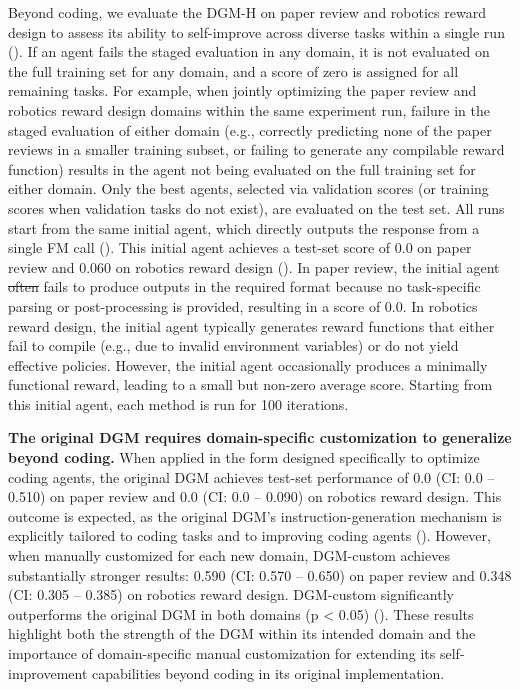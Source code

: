 \documentclass[]{fairmeta}
\providecommand{\DIFdeltex}[1]{{\protect\color{red}\sout{#1}}}                      %
\providecommand{\DIFdelbegin}{} %
\providecommand{\DIFdelend}{} %
\providecommand{\DIFdel}[1]{\texorpdfstring{\DIFdeltex{#1}}{}} %
\begin{document}
Beyond coding, we evaluate the DGM-H on paper review and robotics reward design to assess its ability to self-improve across diverse tasks within a single run (). If an agent fails the staged evaluation in any domain, it is not evaluated on the full training set for any domain, and a score of zero is assigned for all remaining tasks. For example, when jointly optimizing the paper review and robotics reward design domains within the same experiment run, failure in the staged evaluation of either domain (e.g., correctly predicting none of the paper reviews in a smaller training subset, or failing to generate any compilable reward function) results in the agent not being evaluated on the full training set for either domain. Only the best agents, selected via validation scores (or training scores when validation tasks do not exist), are evaluated on the test set.
All runs start from the same initial agent, which directly outputs the response from a single FM call (). This initial agent achieves a test-set score of 0.0 on paper review and 0.060 on robotics reward design (). In paper review, the initial agent \DIFdelbegin \DIFdel{often }\DIFdelend fails to produce outputs in the required format because no task-specific parsing or post-processing is provided, resulting in a score of 0.0. In robotics reward design, the initial agent typically generates reward functions that either fail to compile (e.g., due to invalid environment variables) or do not yield effective policies. However, the initial agent occasionally produces a minimally functional reward, leading to a small but non-zero average score. Starting from this initial agent, each method is run for 100 iterations.

\textbf{The original DGM requires domain-specific customization to generalize beyond coding.} When applied in the form designed specifically to optimize coding agents, the original DGM achieves test-set performance of 0.0 (CI: 0.0 – 0.510) on paper review and 0.0 (CI: 0.0 – 0.090) on robotics reward design. This outcome is expected, as the original DGM's instruction-generation mechanism is explicitly tailored to coding tasks and to improving coding agents (). However, when manually customized for each new domain, DGM-custom achieves substantially stronger results: 0.590 (CI: 0.570 – 0.650) on paper review and 0.348 (CI: 0.305 – 0.385) on robotics reward design. DGM-custom significantly outperforms the original DGM in both domains (p < 0.05) (). These results highlight both the strength of the DGM within its intended domain and the importance of domain-specific manual customization for extending its self-improvement capabilities beyond coding in its original implementation.
\end{document}
